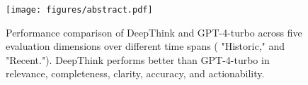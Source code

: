 \begin{figure}[htbp]
\centering
\texttt{[image: figures/abstract.pdf]} %
\caption{Performance comparison of DeepThink and GPT-4-turbo across five evaluation dimensions over different time spans ( "Historic," and "Recent."). DeepThink performs better than GPT-4-turbo in relevance, completeness, clarity, accuracy, and actionability.}
\label{fig:comp}
\end{figure}


